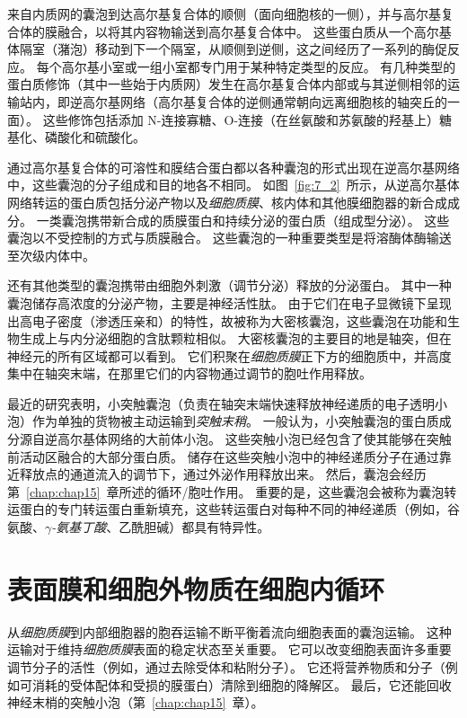 来自内质网的囊泡到达高尔基复合体的顺侧（面向细胞核的一侧），并与高尔基复合体的膜融合，以将其内容物输送到高尔基复合体中。
这些蛋白质从一个高尔基体隔室（潴泡）移动到下一个隔室，从顺侧到逆侧，这之间经历了一系列的酶促反应。
每个高尔基小室或一组小室都专门用于某种特定类型的反应。
有几种类型的蛋白质修饰（其中一些始于内质网）发生在高尔基复合体内部或与其逆侧相邻的运输站内，即逆高尔基网络（高尔基复合体的逆侧通常朝向远离细胞核的轴突丘的一面）。
这些修饰包括添加 N-连接寡糖、O-连接（在丝氨酸和苏氨酸的羟基上）糖基化、磷酸化和硫酸化。


通过高尔基复合体的可溶性和膜结合蛋白都以各种囊泡的形式出现在逆高尔基网络中，这些囊泡的分子组成和目的地各不相同。
如图~\ref{fig:7_2}~所示，从逆高尔基体网络转运的蛋白质包括分泌产物以及\textit{细胞质膜}、核内体和其他膜细胞器的新合成成分。
一类囊泡携带新合成的质膜蛋白和持续分泌的蛋白质（组成型分泌）。
这些囊泡以不受控制的方式与质膜融合。
这些囊泡的一种重要类型是将溶酶体酶输送至次级内体中。


还有其他类型的囊泡携带由细胞外刺激（调节分泌）释放的分泌蛋白。
其中一种囊泡储存高浓度的分泌产物，主要是神经活性肽。
由于它们在电子显微镜下呈现出高电子密度（渗透压亲和）的特性，故被称为大密核囊泡，这些囊泡在功能和生物生成上与内分泌细胞的含肽颗粒相似。
大密核囊泡的主要目的地是轴突，但在神经元的所有区域都可以看到。
它们积聚在\textit{细胞质膜}正下方的细胞质中，并高度集中在轴突末端，在那里它们的内容物通过调节的胞吐作用释放。


最近的研究表明，小突触囊泡（负责在轴突末端快速释放神经递质的电子透明小泡）作为单独的货物被主动运输到\textit{突触末稍}。
一般认为，小突触囊泡的蛋白质成分源自逆高尔基体网络的大前体小泡。
这些突触小泡已经包含了使其能够在突触前活动区融合的大部分蛋白质。
储存在这些突触小泡中的神经递质分子在通过靠近释放点的通道流入的调节下，通过外泌作用释放出来。
然后，囊泡会经历第~\ref{chap:chap15}~章所述的循环/胞吐作用。
重要的是，这些囊泡会被称为囊泡转运蛋白的专门转运蛋白重新填充，这些转运蛋白对每种不同的神经递质（例如，谷氨酸、\textit{$\gamma$-氨基丁酸}、乙酰胆碱）都具有特异性。



\section{表面膜和细胞外物质在细胞内循环}

从\textit{细胞质膜}到内部细胞器的胞吞运输不断平衡着流向细胞表面的囊泡运输。
这种运输对于维持\textit{细胞质膜}表面的稳定状态至关重要。
它可以改变细胞表面许多重要调节分子的活性（例如，通过去除受体和粘附分子）。
它还将营养物质和分子（例如可消耗的受体配体和受损的膜蛋白）清除到细胞的降解区。
最后，它还能回收神经末梢的突触小泡（第~\ref{chap:chap15}~章）。


